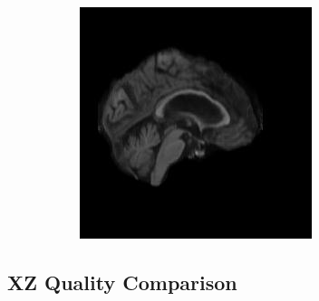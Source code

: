 \documentclass[12pt, fleqn, titlepage]{article}
\newcommand\skipper{1.4pt}
\begin{document}
\begin{figure}[H]
\begin{subfigure}[b]{0.7\textwidth}
		\hskip\skipper
		\includegraphics[width=0.22\linewidth]{imgs/082_S_0469/XY_model_082_S_0469_yz_3}
	\end{subfigure}
\end{figure}

\subsection{XZ Quality Comparison}\label{xz_generated}
\end{document}
